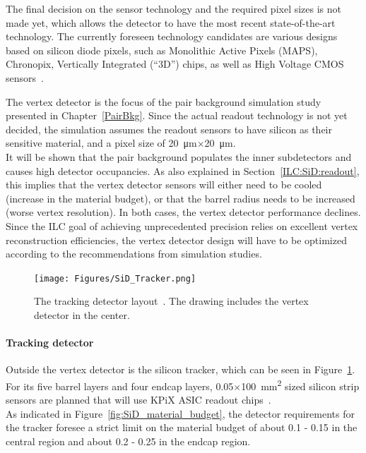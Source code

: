 The final decision on the \sid sensor technology and the required pixel sizes is not made yet, which allows the detector to have the most recent state-of-the-art technology.
The currently foreseen technology candidates are various designs based on silicon diode pixels, such as Monolithic Active Pixels (MAPS), Chronopix, Vertically Integrated (``3D'') chips, as well as High Voltage CMOS sensors~\cites[p. 70 ff]{TDR4}[p. 319 ff]{spieler}. 

The vertex detector is the focus of the \positron\electron pair background simulation study presented in Chapter~\ref{PairBkg}.
Since the actual readout technology is not yet decided, the simulation assumes the readout sensors to have silicon as their sensitive material, and a pixel size of \SI{20}{\micro\meter}$\times$\SI{20}{\micro\meter}.
\\It will be shown that the pair background populates the inner \sid subdetectors and causes high detector occupancies.
As also explained in Section~\ref{ILC:SiD:readout}, this implies that the vertex detector sensors will either need to be cooled (increase in the material budget), or that the barrel radius needs to be increased (worse vertex resolution).
In both cases, the vertex detector performance declines.
Since the ILC goal of achieving unprecedented precision relies on excellent vertex reconstruction efficiencies, the vertex detector design will have to be optimized according to the recommendations from simulation studies.


\begin{figure}[h!]
\centering
\texttt{[image: Figures/SiD\_Tracker.png]}
\caption[Drawing of the \sid tracking detector]{The \sid tracking detector layout~\cite{SiD_Update2}.
The drawing includes the vertex detector in the center.}
\label{fig:SiD_tracker}
\end{figure}

\paragraph{Tracking detector}
Outside the vertex detector is the silicon tracker, which can be seen in Figure~\ref{fig:SiD_tracker}.
For its five barrel layers and four endcap layers, \num{0.05}$\times$\SI{100}{\milli\meter\squared} sized silicon strip sensors are planned that will use KPiX ASIC readout chips~\cite[p. 74ff]{TDR4}.
\\As indicated in Figure~\ref{fig:SiD_material_budget}, the detector requirements for the tracker foresee a strict limit on the material budget of about 0.1 - \SI{0.15}{\xzero} in the central region and about 0.2 - \SI{0.25}{\xzero} in the endcap region.

